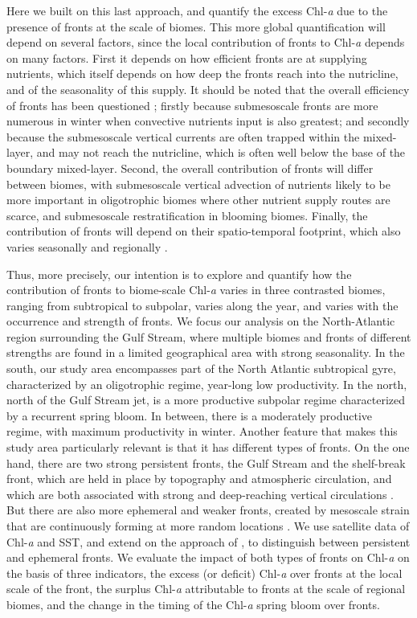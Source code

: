 Here we built on this last approach, and quantify the excess Chl\nobreakdash-\emph{a} due to the presence of fronts at the scale of biomes.
This more global quantification will depend on several factors, since the local contribution of fronts to Chl\nobreakdash-\emph{a} depends on many factors.
First it depends on how efficient fronts are at supplying nutrients, which itself depends on how deep the fronts reach into the nutricline, and of the seasonality of this supply.
It should be noted that the overall efficiency of fronts has been questioned \citep{levy_2018}; firstly because submesoscale fronts are more numerous in winter when convective nutrients input is also greatest; and secondly because the submesoscale vertical currents are often trapped within the mixed-layer, and may not reach the nutricline, which is often well below the base of the boundary mixed-layer.
Second, the overall contribution of fronts will differ between biomes, with submesoscale vertical advection of nutrients likely to be more important in oligotrophic biomes where other nutrient supply routes are scarce, and submesoscale restratification in blooming biomes.
Finally, the contribution of fronts will depend on their spatio-temporal footprint, which also varies seasonally \citep{callies_2015} and regionally \citep{mauzole_2022}.

Thus, more precisely, our intention is to explore and quantify how the contribution of fronts to biome-scale Chl\nobreakdash-\emph{a} varies in three contrasted biomes, ranging from subtropical to subpolar, varies along the year, and varies with the occurrence and strength of fronts.
We focus our analysis on the North-Atlantic region surrounding the Gulf Stream, where multiple biomes and fronts of different strengths are found in a limited geographical area \citep{bock_2022} with strong seasonality.
In the south, our study area encompasses part of the North Atlantic subtropical gyre, characterized by an oligotrophic regime, year-long low productivity.
In the north, north of the Gulf Stream jet, is a more productive subpolar regime characterized by a recurrent spring bloom.
In between, there is a moderately productive regime, with maximum productivity in winter.
Another feature that makes this study area particularly relevant is that it has different types of fronts.
On the one hand, there are two strong persistent fronts, the Gulf Stream and the shelf-break front, which are held in place by topography and atmospheric circulation, and which are both associated with strong and deep-reaching vertical circulations \citep{flagg_2006, liao_2022}.
But there are also more ephemeral and weaker fronts, created by mesoscale strain that are continuously forming at more random locations \citep{drushka_2019, sanchez-rios_2020}.
We use satellite data of Chl\nobreakdash-\emph{a} and SST, and extend on the approach of \citet{liu_2016}, to distinguish between persistent and ephemeral fronts.
We evaluate the impact of both types of fronts on Chl\nobreakdash-\emph{a} on the basis of three indicators, the excess (or deficit) Chl\nobreakdash-\emph{a} over fronts at the local scale of the front, the surplus Chl\nobreakdash-\emph{a} attributable to fronts at the scale of regional biomes, and the change in the timing of the Chl\nobreakdash-\emph{a} spring bloom over fronts.


